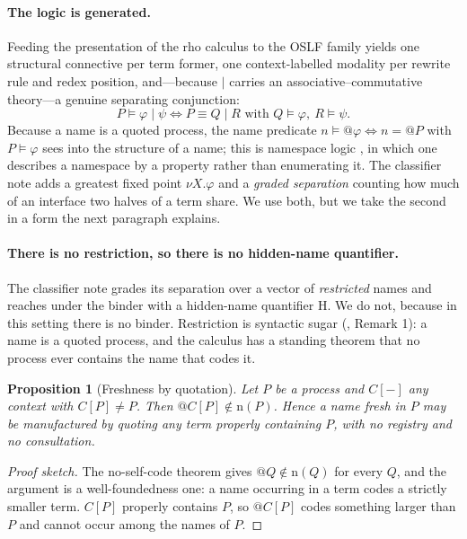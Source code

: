 \documentclass[11pt]{article}
\theoremstyle{definition}
\theoremstyle{plain}
\newtheorem{proposition}[definition]{Proposition}
\theoremstyle{remark}
\newcommand{\rh}{\textsf{rho}}
\newcommand{\Hq}{\mathrm{H}}
\begin{document}
\paragraph{The logic is generated.} Feeding the presentation of the \rh{}
calculus to the OSLF family yields one structural connective per term former,
one context-labelled modality per rewrite rule and redex position, and---because
$\mid$ carries an associative--commutative theory---a genuine separating
conjunction:
\[
P \models \varphi \mid \psi \iff P \equiv Q \mid R \text{ with } Q \models
\varphi,\ R \models \psi .
\]
Because a name is a quoted process, the name predicate $n \models @\varphi \iff
n = @P$ with $P \models \varphi$ sees into the structure of a name; this is
namespace logic \cite{nslogic}, in which one describes a namespace by a property
rather than enumerating it. The classifier note \cite{classifier} adds a
greatest fixed point $\nu X.\varphi$ and a \emph{graded separation} counting how
much of an interface two halves of a term share. We use both, but we take the
second in a form the next paragraph explains.

\paragraph{There is no restriction, so there is no hidden-name quantifier.}
The classifier note grades its separation over a vector of \emph{restricted}
names and reaches under the binder with a hidden-name quantifier $\Hq$. We do
not, because in this setting there is no binder. Restriction is syntactic sugar
(\cite{scientist}, Remark 1): a name is a quoted process, and the calculus has a
standing theorem that no process ever contains the name that codes it.

\begin{proposition}[Freshness by quotation]\label{prop:fresh}
Let $P$ be a process and $C[-]$ any context with $C[P] \neq P$. Then
$@C[P] \notin \mathrm{n}(P)$. Hence a name fresh in $P$ may be manufactured by
quoting any term properly containing $P$, with no registry and no consultation.
\end{proposition}
\begin{proof}[Proof sketch]
The no-self-code theorem gives $@Q \notin \mathrm{n}(Q)$ for every $Q$, and the
argument is a well-foundedness one: a name occurring in a term codes a strictly
smaller term. $C[P]$ properly contains $P$, so $@C[P]$ codes something larger
than $P$ and cannot occur among the names of $P$.
\end{proof}
\end{document}
